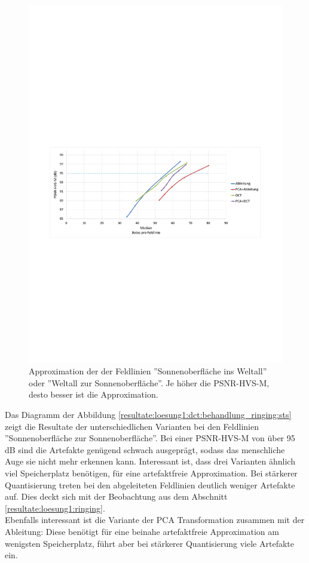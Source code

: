 \begin{figure}[!htbp]
	\center
\includegraphics[trim = 1.8cm 11cm 1.8cm 12.4cm, clip=true,width=1\textwidth,keepaspectratio]{./pictures/resultate/loesung1/ringing/nosts.pdf}
	\caption{Approximation der der Feldlinien ''Sonnenoberfläche ins Weltall'' oder ''Weltall zur Sonnenoberfläche''. Je höher die PSNR-HVS-M, desto besser ist die Approximation.}	\label{resultate:loesung1:dct:behandlung_ringing:nosts}
\end{figure}
Das Diagramm der Abbildung \ref{resultate:loesung1:dct:behandlung_ringing:sts} zeigt die Resultate der unterschiedlichen Varianten bei den Feldlinien ''Sonnenoberfläche zur Sonnenoberfläche''. Bei einer PSNR-HVS-M von über 95 dB sind die Artefakte genügend schwach ausgeprägt, sodass das menschliche Auge sie nicht mehr erkennen kann. Interessant ist, dass drei Varianten ähnlich viel Speicherplatz benötigen, für eine artefaktfreie Approximation. Bei stärkerer Quantisierung treten bei den abgeleiteten Feldlinien deutlich weniger Artefakte auf. Dies deckt sich mit der Beobachtung aus dem Abschnitt \ref{resultate:loesung1:ringing}.\\
Ebenfalls interessant ist die Variante der PCA Transformation zusammen mit der Ableitung: Diese benötigt für eine beinahe artefaktfreie Approximation am wenigsten Speicherplatz, führt aber bei stärkerer Quantisierung viele Artefakte ein.

